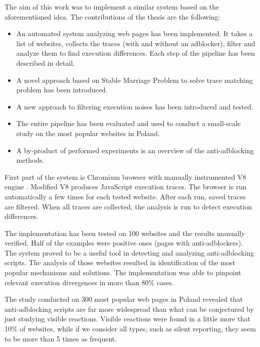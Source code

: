 The aim of this work was to implement a similar system based on the aforementioned idea.
The contributions of the thesis are the following:
\begin{itemize}
  \item An automated system analyzing web pages has been implemented.
           It takes a list of websites, collects the traces (with and without an adblocker), 
           filter and analyze them to find execution differences. 
           Each step of the pipeline has been described in detail.
  \item A novel approach based on Stable Marriage Problem to solve trace matching problem
           has been introduced.
  \item A new approach to filtering execution noises has been introduced and tested.
  \item The entire pipeline has been evaluated and used to conduct a small-scale study on the most
           popular websites in Poland.
  \item A by-product of performed experiments is an overview of the anti-adblocking methods.
\end{itemize}

First part of the system is Chromium browser with manually instrumented V8 engine \cite{v8:main-page}.
Modified V8 produces JavaScript execution traces. 
The browser is run automatically a few times for each tested website.
After each run, saved traces are filtered. When all traces are collected, 
the analysis is run to detect execution differences.

The implementation has been tested on 100 websites and the results manually verified. 
Half of the examples were positive ones (pages with anti-adblockers).
The system proved to be a useful tool in detecting and analyzing anti-adblocking scripts. 
The analysis of those websites resulted in identification of the most popular 
mechanisms and solutions. The implementation was able to pinpoint relevant 
execution divergences in more than 80\% cases.

The study conducted on 300 most popular web pages in Poland revealed that anti-adblocking scripts
are far more widespread than what can be conjectured by just studying visible reactions.
Visible reactions were found in a little more that 10\% of websites, while if we consider all types,
such as silent reporting, they seem to be more than 5 times as frequent.
